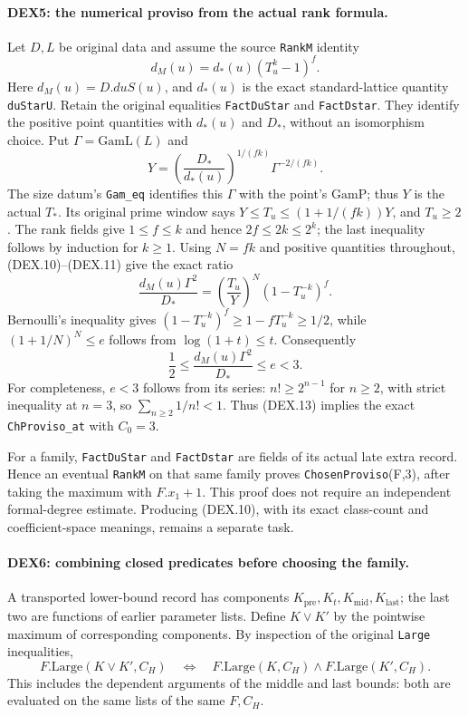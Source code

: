 \paragraph{DEX5: the numerical proviso from the actual rank formula.}
\label{claim:DEX5}
Let $D,L$ be original data and assume the source \texttt{RankM} identity
\[
 d_M(u)=d_*(u)(T_u^k-1)^f.                              \tag{DEX.10}
\]
Here $d_M(u)=D.duS(u)$, and $d_*(u)$ is the exact standard-lattice
quantity \texttt{duStarU}. Retain the original equalities
\texttt{FactDuStar} and \texttt{FactDstar}. They identify the positive
point quantities with $d_*(u)$ and $D_*$, without an isomorphism choice.
Put $\Gamma=\mathrm{GamL}(L)$ and
\[
 Y=\left(\frac{D_*}{d_*(u)}\right)^{1/(fk)}
                  \Gamma^{-2/(fk)} .                    \tag{DEX.11}
\]
The size datum's \texttt{Gam\_eq} identifies this $\Gamma$ with the
point's $\mathrm{GamP}$; thus $Y$ is the actual $T_*$.
Its original prime window says
$Y\le T_u\le(1+1/(fk))Y$, and $T_u\ge2$.
The rank fields give $1\le f\le k$ and hence
$2f\le2k\le2^k$; the last inequality follows by induction for $k\ge1$.
Using $N=fk$ and positive quantities throughout, (DEX.10)--(DEX.11)
give the exact ratio
\[
 \frac{d_M(u)\Gamma^2}{D_*}
       =\left(\frac{T_u}{Y}\right)^N(1-T_u^{-k})^f.       \tag{DEX.12}
\]
Bernoulli's inequality gives
$(1-T_u^{-k})^f\ge1-fT_u^{-k}\ge1/2$, while
$(1+1/N)^N\le e$ follows from $\log(1+t)\le t$.
Consequently
\[
                  \frac12\le\frac{d_M(u)\Gamma^2}{D_*}
                                      \le e<3.           \tag{DEX.13}
\]
For completeness, $e<3$ follows from its series:
$n!\ge2^{n-1}$ for $n\ge2$, with strict inequality at $n=3$, so
$\sum_{n\ge2}1/n!<1$. Thus (DEX.13) implies the exact
\texttt{ChProviso\_at} with $C_0=3$.

For a family, \texttt{FactDuStar} and \texttt{FactDstar} are fields of
its actual late extra record. Hence an eventual \texttt{RankM} on
that same family proves \texttt{ChosenProviso}(F,3), after taking
the maximum with $F.x_1+1$. This proof does not require an independent
formal-degree estimate. Producing (DEX.10), with its exact class-count
and coefficient-space meanings, remains a separate task.

\paragraph{DEX6: combining closed predicates before choosing the family.}
\label{claim:DEX6}
A transported lower-bound record has components
$K_{\mathrm{pre}},K_t,K_{\mathrm{mid}},K_{\mathrm{last}}$;
the last two are functions of earlier parameter lists. Define $K\vee K'$
by the pointwise maximum of corresponding components. By inspection
of the original \texttt{Large} inequalities,
\[
 F.\mathrm{Large}(K\vee K',C_H)
 \quad\Longleftrightarrow\quad
 F.\mathrm{Large}(K,C_H)\wedge F.\mathrm{Large}(K',C_H).   \tag{DEX.14}
\]
This includes the dependent arguments of the middle and last bounds:
both are evaluated on the same lists of the same $F,C_H$.


